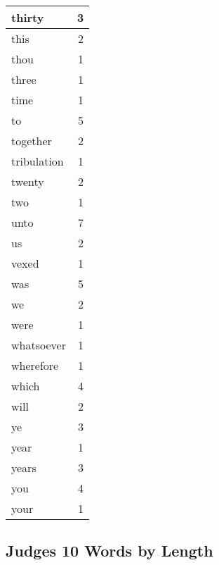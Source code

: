 \begin{center}
\begin{longtable}{l|r}
thirty & 3\\ \hline 
this & 2\\ \hline 
thou & 1\\ \hline 
three & 1\\ \hline 
time & 1\\ \hline 
to & 5\\ \hline 
together & 2\\ \hline 
tribulation & 1\\ \hline 
twenty & 2\\ \hline 
two & 1\\ \hline 
unto & 7\\ \hline 
us & 2\\ \hline 
vexed & 1\\ \hline 
was & 5\\ \hline 
we & 2\\ \hline 
were & 1\\ \hline 
whatsoever & 1\\ \hline 
wherefore & 1\\ \hline 
which & 4\\ \hline 
will & 2\\ \hline 
ye & 3\\ \hline 
year & 1\\ \hline 
years & 3\\ \hline 
you & 4\\ \hline 
your & 1\\ \hline 
\end{longtable}
\end{center}





\subsection{Judges 10 Words by Length}


\normalsize
 
